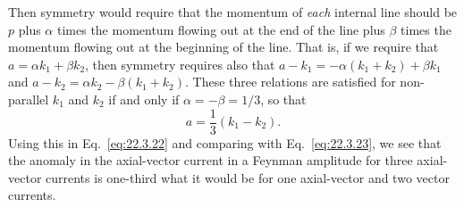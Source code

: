 Then symmetry would require that the momentum of \emph{each} internal line
should be $p$ plus $\alpha$ times the momentum flowing out at the end of the
line plus $\beta$ times the momentum flowing out at the beginning of the
line. That is, if we require that $a=\alpha k_1+\beta k_2$, then symmetry
requires also that
$a-k_1=-\alpha(k_1+k_2)+\beta k_1$ and
$a-k_2=\alpha k_2-\beta(k_1+k_2)$. These three relations are satisfied for
non-parallel $k_1$ and $k_2$ if and only if
$\alpha=-\beta=1/3$, so that
\begin{equation}
 a=\frac13(k_1-k_2).
 \tag{22.3.30}\label{eq:22.3.30}
\end{equation}
Using this in Eq.~\eqref{eq:22.3.22} and comparing with
Eq.~\eqref{eq:22.3.23}, we see that the anomaly in the axial-vector current
in a Feynman amplitude for three axial-vector currents is one-third what it
would be for one axial-vector and two vector currents.


